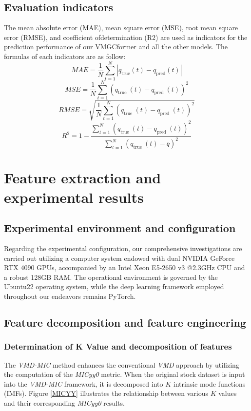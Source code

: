 \documentclass[sn-mathphys,Numbered]{sn-jnl}
\theoremstyle{thmstyleone}%
\theoremstyle{thmstyletwo}%
\theoremstyle{thmstylethree}%
\begin{document}
\subsection{ Evaluation indicators}\label{subsec3}
The mean absolute error (MAE), mean square error (MSE), root mean square error (RMSE), and coefficient ofdetermination (R2) are used as indicators for the prediction performance of
our VMGCformer and all the other models. The formulas of each indicators are as follow:
\begin{equation}
MAE = \frac{1}{N} \sum_{t=1}^N \left| q_{\text{true}}(t) - q_{\text{pred}}(t) \right|
\end{equation}
\begin{equation}
MSE={\frac{1}{N} \sum_{t=1}^N\left(q_{\text {true }}(t)-q_{\text {pred }}(t)\right)^2} 
\end{equation}
\begin{equation}
RMSE=\sqrt{\frac{1}{N} \sum_{t=1}^N\left(q_{\text {true }}(t)-q_{\text {pred }}(t)\right)^2} 
\end{equation}
\begin{equation}
R^2=1-\frac{\sum_{t=1}^N\left(q_{\text {true }}(t)-q_{\text {pred }}(t)\right)^2}{\sum_{t=1}^N\left(q_{\text {true }}(t)-\bar{q}\right)^2}
\end{equation}



\section{Feature extraction and experimental results}\label{sec4}
\subsection{Experimental environment and configuration}\label{subsubsec1}
Regarding the experimental configuration, our comprehensive investigations are carried out utilizing a computer system endowed with dual NVIDIA GeForce RTX 4090 GPUs, accompanied by an Intel Xeon E5-2650 v3 @2.3GHz CPU and a robust 128GB RAM. The operational environment is governed by the Ubuntu22 operating system, while the deep learning framework employed throughout our endeavors remains PyTorch.

\subsection{Feature decomposition and feature engineering}\label{subsubsec1}
\subsubsection{Determination of K Value and decomposition of features}\label{subsubsec1}
The \textit{VMD-MIC} method enhances the conventional \textit{VMD} approach by utilizing the computation of the \textit{MICyy0} metric. When the original stock dataset is input into the \textit{VMD-MIC} framework, it is decomposed into \( K \) intrinsic mode functions (IMFs). Figure \ref{MICYY} illustrates the relationship between various \( K \) values and their corresponding \textit{MICyy0} results. 
\end{document}
